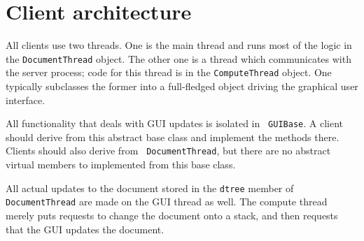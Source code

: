 
\section{Client architecture}

All clients use two threads. One is the main thread and runs most of
the logic in the {\tt DocumentThread} object. The other one is a
thread which communicates with the server process; code for this
thread is in the {\tt ComputeThread} object.  One typically subclasses
the former into a full-fledged object driving the graphical user
interface.

All functionality that deals with GUI updates is isolated in {\tt
  GUIBase}. A client should derive from this abstract base class and
implement the methods there. Clients should also derive from {\tt
  DocumentThread}, but there are no abstract virtual members to
implemented from this base class.

All actual updates to the document stored in the \verb|dtree| member
of \verb|DocumentThread| are made on the GUI thread as well. The
compute thread merely puts requests to change the document onto a
stack, and then requests that the GUI updates the document.
